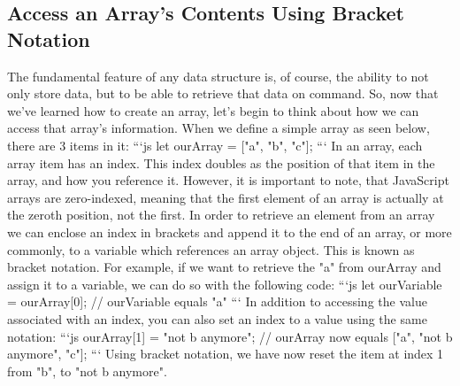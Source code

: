\documentclass{article}%
\begin{document}
%
\subsection{Access an Array's Contents Using Bracket Notation}%
\label{subsec:AccessanArraysContentsUsingBracketNotation}%
The fundamental feature of any data structure is, of course, the ability to not only store data, but to be able to retrieve that data on command. So, now that we've learned how to create an array, let's begin to think about how we can access that array's information.\newline%
When we define a simple array as seen below, there are 3 items in it:\newline%
```js\newline%
let ourArray = {[}"a", "b", "c"{]};\newline%
```\newline%
In an array, each array item has an index.  This index doubles as the position of that item in the array, and how you reference it. However, it is important to note, that JavaScript arrays are zero{-}indexed, meaning that the first element of an array is actually at the zeroth position, not the first.\newline%
In order to retrieve an element from an array we can enclose an index in brackets and append it to the end of an array, or more commonly, to a variable which references an array object. This is known as bracket notation.\newline%
For example, if we want to retrieve the "a" from ourArray and assign it to a variable, we can do so with the following code:\newline%
```js\newline%
let ourVariable = ourArray{[}0{]};\newline%
// ourVariable equals "a"\newline%
```\newline%
In addition to accessing the value associated with an index, you can also set an index to a value using the same notation:\newline%
```js\newline%
ourArray{[}1{]} = "not b anymore";\newline%
// ourArray now equals {[}"a", "not b anymore", "c"{]};\newline%
```\newline%
Using bracket notation, we have now reset the item at index 1 from "b", to "not b anymore".\newline%
\end{document}

